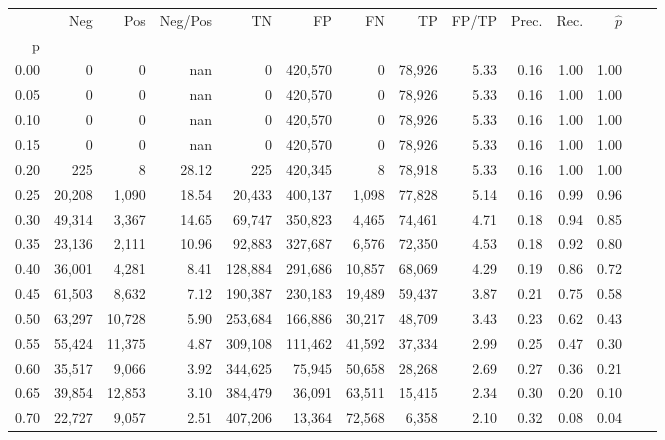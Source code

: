 \begin{tabular}{rrrrrrrrrrrrrr}
\toprule
{} &     Neg &     Pos & Neg/Pos &       TN &       FP &      FN &      TP & FP/TP & Prec. &  Rec. & $\hat{p}$ \\
p    &         &         &         &          &          &         &         &       &       &       &           \\
\midrule
0.00 &       0 &       0 &     nan &        0 &  420,570 &       0 &  78,926 &  5.33 &  0.16 &  1.00 &      1.00 \\
0.05 &       0 &       0 &     nan &        0 &  420,570 &       0 &  78,926 &  5.33 &  0.16 &  1.00 &      1.00 \\
0.10 &       0 &       0 &     nan &        0 &  420,570 &       0 &  78,926 &  5.33 &  0.16 &  1.00 &      1.00 \\
0.15 &       0 &       0 &     nan &        0 &  420,570 &       0 &  78,926 &  5.33 &  0.16 &  1.00 &      1.00 \\
0.20 &     225 &       8 &   28.12 &      225 &  420,345 &       8 &  78,918 &  5.33 &  0.16 &  1.00 &      1.00 \\
0.25 &  20,208 &   1,090 &   18.54 &   20,433 &  400,137 &   1,098 &  77,828 &  5.14 &  0.16 &  0.99 &      0.96 \\
0.30 &  49,314 &   3,367 &   14.65 &   69,747 &  350,823 &   4,465 &  74,461 &  4.71 &  0.18 &  0.94 &      0.85 \\
0.35 &  23,136 &   2,111 &   10.96 &   92,883 &  327,687 &   6,576 &  72,350 &  4.53 &  0.18 &  0.92 &      0.80 \\
0.40 &  36,001 &   4,281 &    8.41 &  128,884 &  291,686 &  10,857 &  68,069 &  4.29 &  0.19 &  0.86 &      0.72 \\
0.45 &  61,503 &   8,632 &    7.12 &  190,387 &  230,183 &  19,489 &  59,437 &  3.87 &  0.21 &  0.75 &      0.58 \\
0.50 &  63,297 &  10,728 &    5.90 &  253,684 &  166,886 &  30,217 &  48,709 &  3.43 &  0.23 &  0.62 &      0.43 \\
0.55 &  55,424 &  11,375 &    4.87 &  309,108 &  111,462 &  41,592 &  37,334 &  2.99 &  0.25 &  0.47 &      0.30 \\
0.60 &  35,517 &   9,066 &    3.92 &  344,625 &   75,945 &  50,658 &  28,268 &  2.69 &  0.27 &  0.36 &      0.21 \\
0.65 &  39,854 &  12,853 &    3.10 &  384,479 &   36,091 &  63,511 &  15,415 &  2.34 &  0.30 &  0.20 &      0.10 \\
0.70 &  22,727 &   9,057 &    2.51 &  407,206 &   13,364 &  72,568 &   6,358 &  2.10 &  0.32 &  0.08 &      0.04 \\

\end{tabular}
